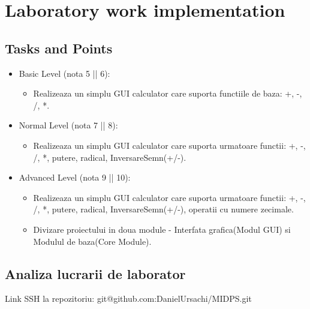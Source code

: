 \section{Laboratory work implementation}

\subsection{Tasks and Points}

\begin{itemize}
	\item Basic Level (nota 5 || 6):
	
	\begin{itemize}
		\item Realizeaza un simplu GUI calculator care suporta functiile de baza: +, -, /, *.
	\end{itemize}
	
	\item Normal Level (nota 7 || 8):
	
	\begin{itemize}
		\item Realizeaza un simplu GUI calculator care suporta urmatoare functii: +, -, /, *, putere, radical, InversareSemn(+/-).
	\end{itemize}
	\item Advanced Level (nota 9 || 10):
	
	\begin{itemize}
		\item Realizeaza un simplu GUI calculator care suporta urmatoare functii: +, -, /, *, putere, radical, InversareSemn(+/-), operatii cu numere zecimale.
	\end{itemize}
	\begin{itemize}
		\item Divizare proiectului in doua module - Interfata grafica(Modul GUI) si Modulul de baza(Core Module).
	\end{itemize}
\end{itemize}

\subsection{Analiza lucrarii de laborator}

Link SSH la repozitoriu: git@github.com:DanielUrsachi/MIDPS.git


